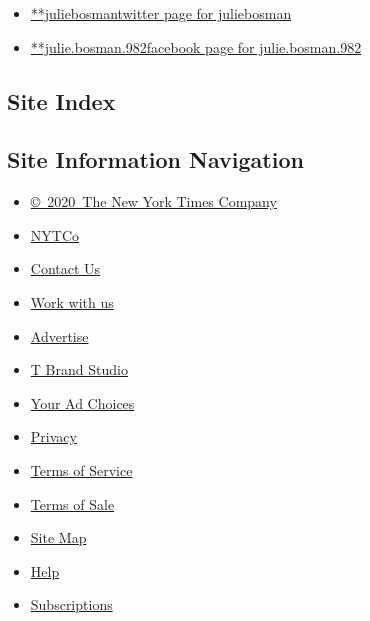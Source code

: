 \begin{itemize}
\tightlist
\item
  \href{https://twitter.com/juliebosman}{**juliebosmantwitter page for
  juliebosman}
\item
  \href{https://www.facebookcorewwwi.onion/julie.bosman.982}{**julie.bosman.982facebook
  page for julie.bosman.982}
\end{itemize}

\hypertarget{site-index}{%
\subsection{Site Index}\label{site-index}}

\hypertarget{site-information-navigation}{%
\subsection{Site Information
Navigation}\label{site-information-navigation}}

\begin{itemize}
\tightlist
\item
  \href{https://help.nytimes3xbfgragh.onion/hc/en-us/articles/115014792127-Copyright-notice}{©~2020~The
  New York Times Company}
\end{itemize}

\begin{itemize}
\tightlist
\item
  \href{https://www.nytco.com/}{NYTCo}
\item
  \href{https://help.nytimes3xbfgragh.onion/hc/en-us/articles/115015385887-Contact-Us}{Contact
  Us}
\item
  \href{https://www.nytco.com/careers/}{Work with us}
\item
  \href{https://nytmediakit.com/}{Advertise}
\item
  \href{http://www.tbrandstudio.com/}{T Brand Studio}
\item
  \href{https://www.nytimes3xbfgragh.onion/privacy/cookie-policy\#how-do-i-manage-trackers}{Your
  Ad Choices}
\item
  \href{https://www.nytimes3xbfgragh.onion/privacy}{Privacy}
\item
  \href{https://help.nytimes3xbfgragh.onion/hc/en-us/articles/115014893428-Terms-of-service}{Terms
  of Service}
\item
  \href{https://help.nytimes3xbfgragh.onion/hc/en-us/articles/115014893968-Terms-of-sale}{Terms
  of Sale}
\item
  \href{https://spiderbites.nytimes3xbfgragh.onion}{Site Map}
\item
  \href{https://help.nytimes3xbfgragh.onion/hc/en-us}{Help}
\item
  \href{https://www.nytimes3xbfgragh.onion/subscription?campaignId=37WXW}{Subscriptions}
\end{itemize}
